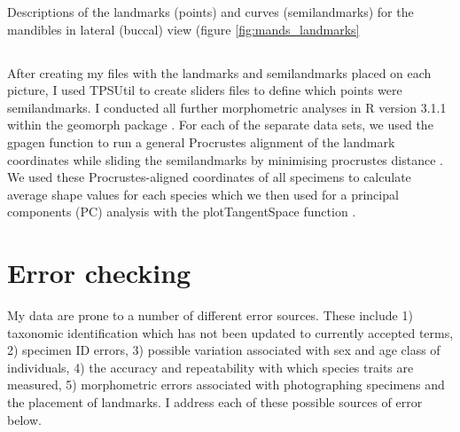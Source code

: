 \begin{table}[!htb]			
	\centering
	\caption[Mandibles: landmarks]
		{Descriptions of the landmarks (points) and curves (semilandmarks) for the mandibles in lateral (buccal) view (figure \ref{fig:mands_landmarks}}
	
	\label{tab:mands} 
\end{table}

\subsection{}
\label{sect:procrustes}

	After creating my files with the landmarks and semilandmarks placed on each picture, I used TPSUtil \citep{Rohlf2012} to create sliders files \citep{Zelditch2012} to define which points were semilandmarks. I conducted all further morphometric analyses in R version 3.1.1 \citep{Team2014} within the geomorph package \citep{Adams2013}.
	For each of the separate data sets, we used the gpagen function to run a general Procrustes alignment \citep{Rohlf1993} of the landmark coordinates while sliding the semilandmarks by minimising procrustes distance \citep{Bookstein1997}.
	We used these Procrustes-aligned coordinates of all specimens to calculate average shape values for each species which we then used for a principal components (PC) analysis with the plotTangentSpace function \citep{Adams2013}. 




\section{Error checking}
\label{sect:errors}
	My data are prone to a number of different error sources. These include 1) taxonomic identification which has not been updated to currently accepted terms, 2) specimen ID errors, 3) possible variation associated with sex and age class of individuals, 4) the accuracy and repeatability with which species traits are measured, 5) morphometric errors associated with photographing specimens and the placement of landmarks. I address each of these possible sources of error below.  

